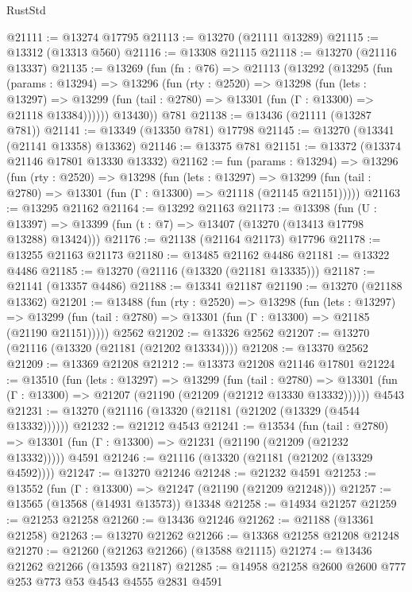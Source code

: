 \begin{lexlean}{RustStd}
\begin{coremodule}
@21111 := @13274 @17795
@21113 := @13270 (@21111 @13289)
@21115 := @13312 (@13313 @560)
@21116 := @13308 @21115
@21118 := @13270 (@21116 @13337)
@21135 := @13269
    (fun (fn : @76) =>
    @21113
      (@13292
        (@13295
          (fun (params : @13294) =>
          @13296
            (fun (rty : @2520) =>
            @13298
              (fun (lets : @13297) =>
              @13299 (fun (tail : @2780) => @13301 (fun (Γ : @13300) => @21118 @13384))))))
        @13430))
    @781
@21138 := @13436 (@21111 (@13287 @781))
@21141 := @13349 (@13350 @781) @17798
@21145 := @13270 (@13341 (@21141 @13358) @13362)
@21146 := @13375 @781
@21151 := @13372 (@13374 @21146 @17801 @13330 @13332)
@21162 := fun (params : @13294) =>
  @13296
    (fun (rty : @2520) =>
    @13298
      (fun (lets : @13297) =>
      @13299 (fun (tail : @2780) => @13301 (fun (Γ : @13300) => @21118 (@21145 @21151)))))
@21163 := @13295 @21162
@21164 := @13292 @21163
@21173 := @13398
    (fun (U : @13397) => @13399 (fun (t : @7) => @13407 (@13270 (@13413 @17798 @13288) @13424)))
@21176 := @21138 (@21164 @21173) @17796
@21178 := @13255 @21163 @21173
@21180 := @13485 @21162 @4486
@21181 := @13322 @4486
@21185 := @13270 (@21116 (@13320 (@21181 @13335)))
@21187 := @21141 (@13357 @4486)
@21188 := @13341 @21187
@21190 := @13270 (@21188 @13362)
@21201 := @13488
    (fun (rty : @2520) =>
    @13298
      (fun (lets : @13297) =>
      @13299 (fun (tail : @2780) => @13301 (fun (Γ : @13300) => @21185 (@21190 @21151)))))
    @2562
@21202 := @13326 @2562
@21207 := @13270 (@21116 (@13320 (@21181 (@21202 @13334))))
@21208 := @13370 @2562
@21209 := @13369 @21208
@21212 := @13373 @21208 @21146 @17801
@21224 := @13510
    (fun (lets : @13297) =>
    @13299
      (fun (tail : @2780) =>
      @13301 (fun (Γ : @13300) => @21207 (@21190 (@21209 (@21212 @13330 @13332))))))
    @4543
@21231 := @13270 (@21116 (@13320 (@21181 (@21202 (@13329 (@4544 @13332))))))
@21232 := @21212 @4543
@21241 := @13534
    (fun (tail : @2780) => @13301 (fun (Γ : @13300) => @21231 (@21190 (@21209 (@21232 @13332)))))
    @4591
@21246 := @21116 (@13320 (@21181 (@21202 (@13329 @4592))))
@21247 := @13270 @21246
@21248 := @21232 @4591
@21253 := @13552 (fun (Γ : @13300) => @21247 (@21190 (@21209 @21248)))
@21257 := @13565 (@13568 (@14931 @13573)) @13348
@21258 := @14934 @21257
@21259 := @21253 @21258
@21260 := @13436 @21246
@21262 := @21188 (@13361 @21258)
@21263 := @13270 @21262
@21266 := @13368 @21258 @21208 @21248
@21270 := @21260 (@21263 @21266) (@13588 @21115)
@21274 := @13436 @21262 @21266 (@13593 @21187)
@21285 := @14958 @21258 @2600 @2600 @777 @253 @773 @53 @4543 @4555 @2831 @4591

\end{coremodule}
\end{lexlean}

